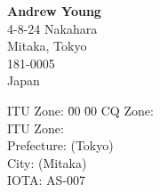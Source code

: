 \documentclass{article}
\begin{document}
\begin{minipage}{\textwidth}
\end{minipage}

\bigskip

\begin{minipage}[t]{114mm}

\begin{minipage}[t]{0.3\textwidth}
    \textbf{Andrew Young} \\
    \footnotesize
    4-8-24 Nakahara
 \\
    Mitaka, Tokyo
 \\
    181-0005 \\
    Japan
\end{minipage}
\begin{minipage}[t]{0.35\textwidth}
    \begin{footnotesize}
        \begin{tabbing}
            ITU Zone:
                \=  00
                \=  00
                \kill
            CQ Zone:
                 \,
                \>  \\
            ITU Zone:
                 \,
                \>  \\
            Prefecture:
                 (Tokyo) \,
                \>  \\
            City:
                 (Mitaka) \,
                \>  \\
            IOTA:
                \>  AS-007 \\
                \>  \\
        \end{tabbing}
    \end{footnotesize}
\end{minipage}
\hfill
\begin{minipage}[t]{0.35\textwidth}
    \scriptsize
\end{minipage}
\vfill
\begin{minipage}{\textwidth}

\end{minipage}
\end{minipage}
\end{document}
